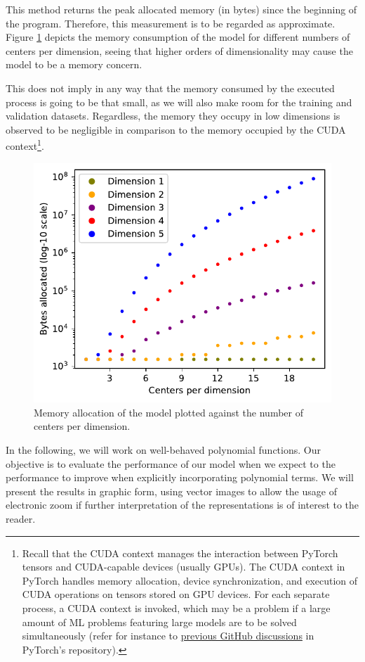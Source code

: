 \documentclass[12pt]{report} %
\begin{document}
This method returns the peak allocated memory (in bytes) since the beginning of the program. Therefore, this
measurement is to be regarded as approximate. Figure \ref{fig:model-consumption-memory} depicts the memory consumption of the
model for different numbers of centers per dimension, seeing that higher orders of dimensionality may cause the model to be a memory concern.

This does not imply in any way that the memory consumed by the executed process is going to be that small, as we will also make room for the training and validation datasets. Regardless, the memory they occupy in low dimensions is observed to be negligible in comparison to the memory occupied by the CUDA context\footnote{Recall that the CUDA context manages the interaction between PyTorch tensors and CUDA-capable devices (usually GPUs). The CUDA context in PyTorch handles memory allocation, device synchronization, and execution of CUDA operations on tensors stored on GPU devices. For each separate process, a CUDA context is invoked, which may be a problem if a large amount of ML problems featuring large models are to be solved simultaneously  (refer for instance to \href{https://github.com/pytorch/pytorch/issues/20532}{previous GitHub discussions} in PyTorch's repository).}.


\begin{figure}[ht]
  \includegraphics[width=.7\textwidth]{imagenes/model_consumption/Memory_allocation_vs_number_of_centers_per_dimension.pdf}
  \caption{Memory allocation of the model plotted against the number of centers per dimension.}
  \label{fig:model-consumption-memory}
\end{figure}

In the following, we will work on well-behaved polynomial functions. Our objective is to evaluate the performance of our model when we expect to the performance to improve when explicitly incorporating polynomial terms. We will present the results in graphic form, using vector images to allow the usage of electronic zoom if further interpretation of the representations is of interest to the reader.
\end{document}
